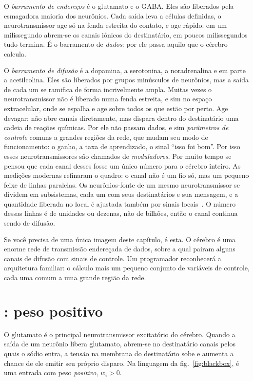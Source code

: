 O \emph{barramento de endereços} é o glutamato e o GABA. Eles são liberados pela esmagadora maioria dos neurônios. Cada saída leva a células definidas, o neurotransmissor age só na fenda estreita do contato, e age rápido: em um milissegundo abrem-se os canais iônicos do destinatário, em poucos milissegundos tudo termina. É o barramento de \emph{dados}: por ele passa aquilo que o cérebro calcula.

O \emph{barramento de difusão} é a dopamina, a serotonina, a noradrenalina e em parte a acetilcolina. Eles são liberados por grupos minúsculos de neurônios, mas a saída de cada um se ramifica de forma incrivelmente ampla. Muitas vezes o neurotransmissor não é liberado numa fenda estreita, e sim no espaço extracelular, onde se espalha e age sobre todos os que estão por perto. Age devagar: não abre canais diretamente, mas dispara dentro do destinatário uma cadeia de reações químicas. Por ele não passam dados, e sim \emph{parâmetros de controle} comuns a grandes regiões da rede, que mudam seu modo de funcionamento: o ganho, a taxa de aprendizado, o sinal ``isso foi bom''. Por isso esses neurotransmissores são chamados de \emph{moduladores}. Por muito tempo se pensou que cada canal desses fosse um único número para o cérebro inteiro. As medições modernas refinaram o quadro: o canal não é um fio só, mas um pequeno feixe de linhas paralelas. Os neurônios-fonte de um mesmo neurotransmissor se dividem em subsistemas, cada um com seus destinatários e sua mensagem, e a quantidade liberada no local é ajustada também por sinais locais~\cite{Ren2018,Poe2020}. O número dessas linhas é de unidades ou dezenas, não de bilhões, então o canal continua sendo de difusão.

Se você precisa de uma única imagem deste capítulo, é esta. O cérebro é uma enorme rede de transmissão endereçada de dados, sobre a qual pairam alguns canais de difusão com sinais de controle. Um programador reconhecerá a arquitetura familiar: o cálculo mais um pequeno conjunto de variáveis de controle, cada uma comum a uma grande região da rede.

\section{: peso positivo}

O glutamato é o principal neurotransmissor excitatório do cérebro. Quando a saída de um neurônio libera glutamato, abrem-se no destinatário canais pelos quais o sódio entra, a tensão na membrana do destinatário sobe e aumenta a chance de ele emitir seu próprio disparo. Na linguagem da fig.~\ref{fig:blackbox}, é uma entrada com peso \emph{positivo}, $w_i>0$.

